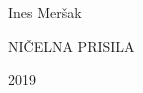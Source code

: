\documentclass[oneside,12pt]{article}
\title{\Title}
\author{\Author}
\date{\today}
\newcommand{\Author}{Ines Meršak}
\begin{document}
\thispagestyle{empty}  %

\begin{turn}{90}
  \Author
\end{turn}
\vfill
\begin{turn}{90}
  NIČELNA PRISILA
\end{turn}
\vfill
\begin{turn}{90}
  2019
\end{turn}


\end{document}
